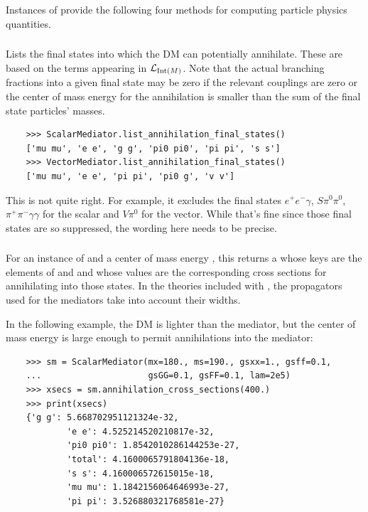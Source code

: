 Instances of  provide the following four methods for computing particle physics quantities.

\subsubsection{}

Lists the final states into which the DM can potentially annihilate. These are based on the terms appearing in $\mathcal{L}_{{\mathrm{Int}}(M)}$. Note that the actual branching fractions into a given final state may be zero if the relevant couplings are zero or the center of mass energy for the annihilation is smaller than the sum of the final state particles' masses.
\begin{verbatim}
    >>> ScalarMediator.list_annihilation_final_states()
    ['mu mu', 'e e', 'g g', 'pi0 pi0', 'pi pi', 's s']
    >>> VectorMediator.list_annihilation_final_states()
    ['mu mu', 'e e', 'pi pi', 'pi0 g', 'v v']
\end{verbatim}
{\color{red} This is not quite right. For example, it excludes the final states $e^+ e^- \gamma$, $S \pi^0 \pi^0$, $\pi^+ \pi^- \gamma \gamma$ for the scalar and $V \pi^0$ for the vector. While that's fine since those final states are so suppressed, the wording here needs to be precise.}

\subsubsection{}

For an instance  of  and a center of mass energy , this returns a  whose keys are the elements of  and  and whose values are the corresponding cross sections for annihilating into those states. In the theories included with \hazma, the propagators used for the mediators take into account their widths.

In the following example, the DM is lighter than the mediator, but the center of mass energy is large enough to permit annihilations into the mediator:
\begin{verbatim}
    >>> sm = ScalarMediator(mx=180., ms=190., gsxx=1., gsff=0.1,
    ...                     gsGG=0.1, gsFF=0.1, lam=2e5)
    >>> xsecs = sm.annihilation_cross_sections(400.)
    >>> print(xsecs)
    {'g g': 5.668702951121324e-32,
            'e e': 4.525214520210817e-32,
            'pi0 pi0': 1.8542010286144253e-27,
            'total': 4.1600065791804136e-18,
            's s': 4.160006572615015e-18,
            'mu mu': 1.1842156064646993e-27,
            'pi pi': 3.526880321768581e-27}
\end{verbatim}

